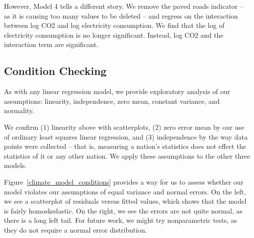 \documentclass[11pt]{article}
\begin{document}
However, Model 4 tells a different story.
We remove the paved roads indicator -- as it is causing too many values to be deleted -- and regress on the interaction between log CO2 and log electricity consumption.
We find that the log of electricity consumption is no longer significant.
Instead, log CO2 and the interaction term are significant.

\subsection{Condition Checking}
As with any linear regression model, we provide exploratory analysis of our assumptions: linearity, independence, zero mean, constant variance, and normality.

We confirm (1) linearity above with scatterplots, (2) zero error mean by our use of ordinary least squares linear regression, and (3) independence by the way data points were collected -- that is, measuring a nation's statistics does not effect the statistics of it or any other nation. We apply these assumptions to the other three models.

Figure~\ref{climate_model_conditions} provides a way for us to assess whether our model violates our assumptions of equal variance and normal errors. On the left, we see a scatterplot of residuals versus fitted values, which shows that the model is fairly homoskedastic. On the right, we see the errors are not quite normal, as there is a long left tail. For future work, we might try nonparametric tests, as they do not require a normal error distribution.
\end{document}
